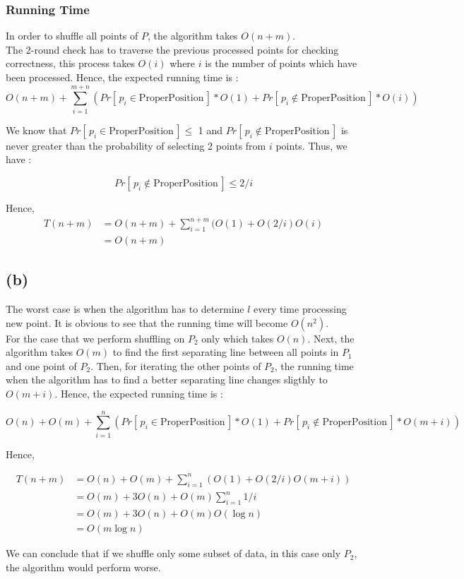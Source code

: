 \subsubsection*{Running Time}
In order to shuffle all points of $P$, the algorithm takes $O(n+m)$.\\

The 2-round check has to traverse the previous processed points for checking correctness, this process takes $O(i)$ where $i$ is the number of points which have been processed. Hence, the expected running time is :
$$
O(n+m) + \sum_{i=1}^{m+n}{ ( Pr[\,p_i \in \text{ProperPosition}\,]*O(1)
    + Pr[\,p_i \not\in \text{ProperPosition}\,]*O(i)
) }
$$

We know that $Pr[\,p_i \in \text{ProperPosition}\,] \le$ 1 and $Pr[\,p_i \not\in \text{ProperPosition}\,]$
is never greater than the probability of selecting 2 points from $i$ points. Thus,
we have :

$$
Pr[\,p_i \not\in \text{ProperPosition}\,] \le 2/i
$$

Hence,
\begin{align*}
T(n+m) &= O(n+m) + \sum_{i=1}^{n+m}( O(1) + O(2/i)O(i) \\
&= O(n+m)
\end{align*}

\subsection*{(b)}
The worst case is when the algorithm has to determine $l$ every time processing
new point. It is obvious to see that the running time will become $O(n^2)$. \\

For the case that we perform shuffling on $P_2$ only which takes $O(n)$. Next,
the algorithm takes $O(m)$ to find the first separating line between all points in $P_1$
and one point of $P_2$. Then, for iterating the other points of $P_2$, the running
time when the algorithm has to find a better separating line changes sligthly to
$O(m+i)$. Hence, the expected running time is :

$$
O(n) + O(m) + \sum_{i=1}^{n}{ ( Pr[\,p_i \in \text{ProperPosition}\,]*O(1)
    + Pr[\,p_i \not\in \text{ProperPosition}\,]*O(m+i)
) }
$$

Hence,

\begin{align*}
T(n+m) &= O(n) + O(m) + \sum_{i=1}^{n}(O(1) + O(2/i)O(m+i)) \\
&= O(m) + 3O(n) + O(m)\sum_{i=1}^{n}1/i \\
&= O(m) + 3O(n) + O(m)O(\log{n}) \\
&= O(m\log{n})
\end{align*}

We can conclude that if we shuffle only some subset of data, in this case only $P_2$,
the algorithm would perform worse.
